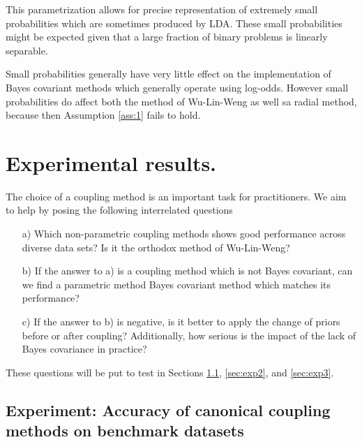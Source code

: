 This parametrization allows for precise representation of extremely small probabilities which are sometimes produced by LDA. These small probabilities might be expected given that a large fraction of binary problems is linearly separable. 

Small probabilities generally have very little effect on the implementation of Bayes covariant methods which generally operate using log-odds. However small probabilities do affect both the method of Wu-Lin-Weng as well sa radial method, because then Assumption \ref{ass:1} fails to hold. 


\section{Experimental results.}

The choice of a coupling method is an important task for practitioners. We aim to help by posing the following interrelated questions 

\begin{itemize}
\item[a)] Which non-parametric coupling methods shows good performance across diverse data sets? Is it the orthodox method of Wu-Lin-Weng?
\item[b)] If the answer to a) is a coupling method which is not Bayes covariant, can we find a parametric method Bayes covariant method which  matches its performance?
\item[c)] If the answer to b) is negative, is it better to apply the change of priors before or after coupling? Additionally, how serious is the impact of the lack of Bayes covariance in practice?
\end{itemize}

These questions will be put to test in Sections \ref{sec:exp1}, \ref{sec:exp2}, and \ref{sec:exp3}.



\subsection{Experiment: Accuracy of canonical coupling methods on benchmark datasets} \label{sec:exp1}

